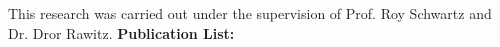 This research was carried out under the supervision of Prof. Roy Schwartz and Dr. Dror Rawitz.
\vfill
\noindent\textbf{Publication List:}
\begin{bibunit}
    \renewcommand{\chapter}[2]{}%
    \makeatletter
    \renewcommand\@biblabel[1]{#1.}
    \makeatother
    \nocite{*}
    \putbib[publist]
\end{bibunit}
